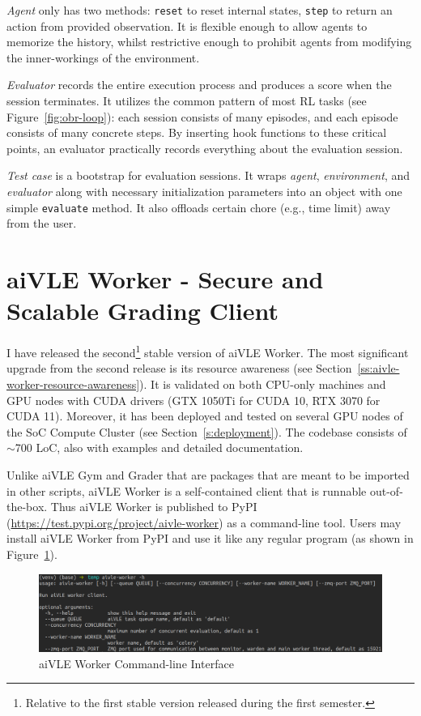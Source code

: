 \textit{Agent} only has two methods: \texttt{reset} to reset internal states, \texttt{step} to return an action from provided observation. It is flexible enough to allow agents to memorize the history, whilst restrictive enough to prohibit agents from modifying the inner-workings of the environment.

\textit{Evaluator} records the entire execution process and produces a score when the session terminates. It utilizes the common pattern of most RL tasks (see Figure~\ref{fig:obr-loop}): each session consists of many episodes, and each episode consists of many concrete steps. By inserting hook functions to these critical points, an evaluator practically records everything about the evaluation session. 

\textit{Test case} is a bootstrap for evaluation sessions. It wraps \textit{agent}, \textit{environment}, and \textit{evaluator} along with necessary initialization parameters into an object with one simple \texttt{evaluate} method. It also offloads certain chore (e.g., time limit) away from the user.

\section{aiVLE Worker - Secure and Scalable Grading Client}
\label{ch:aivle-worker}
I have released the second\footnote{Relative to the first stable version released during the first semester.} stable version of aiVLE Worker. The most significant upgrade from the second release is its resource awareness (see Section~\ref{ss:aivle-worker-resource-awareness}). It is validated on both CPU-only machines and GPU nodes with CUDA drivers (GTX 1050Ti for CUDA 10, RTX 3070 for CUDA 11). Moreover, it has been deployed and tested on several GPU nodes of the SoC Compute Cluster (see Section~\ref{s:deployment}). The codebase consists of $\sim$700 LoC, also with examples and detailed documentation. 

Unlike aiVLE Gym and Grader that are packages that are meant to be imported in other scripts, aiVLE Worker is a self-contained client that is runnable out-of-the-box. Thus aiVLE Worker is published to PyPI (\href{https://test.pypi.org/project/aivle-worker}{https://test.pypi.org/project/aivle-worker})  as a command-line tool. Users may install aiVLE Worker from PyPI and use it like any regular program (as shown in Figure~\ref{fig:aivle-worker-cli}).

\begin{figure}[H]
    \centering
    \includegraphics[width=\textwidth]{images/aivle-worker-cli.png}
    \caption{aiVLE Worker Command-line Interface}
    \label{fig:aivle-worker-cli}
\end{figure}

